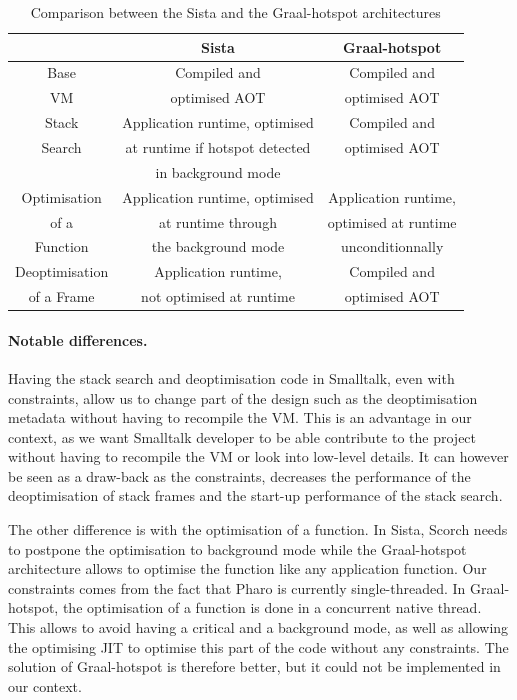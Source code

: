 \documentclass[a4paper,12pt,twoside]{../includes/ThesisStyle}
\begin{document}
\begin{table}
  \caption{Comparison between the Sista and the Graal-hotspot architectures}
  \vspace{0.1cm}
  \centering
  \begin{tabular}{c||c|c}
    \toprule
    & Sista & Graal-hotspot \\
    \midrule
    \midrule
	Base & Compiled and & Compiled and \\
	VM & optimised AOT & optimised AOT \\
    \midrule
	Stack & Application runtime, optimised & Compiled and \\
	Search & at runtime if hotspot detected & optimised AOT \\
	 & in background mode & \\
    \midrule
	Optimisation & Application runtime, optimised & Application runtime,\\
	of a & at runtime through & optimised at runtime \\
	Function & the background mode & unconditionnally \\
    \midrule
	Deoptimisation & Application runtime, & Compiled and \\
	of a Frame & not optimised at runtime & optimised AOT \\
	\bottomrule
  \end{tabular}
  \label{tbl:comparison}
\end{table}

\paragraph{Notable differences.}Having the stack search and deoptimisation code in Smalltalk, even with constraints, allow us to change part of the design such as the deoptimisation metadata without having to recompile the VM. This is an advantage in our context, as we want Smalltalk developer to be able contribute to the project without having to recompile the VM or look into low-level details. It can however be seen as a draw-back as the constraints, decreases the performance of the deoptimisation of stack frames and the start-up performance of the stack search.

The other difference is with the optimisation of a function. In Sista, Scorch needs to postpone the optimisation to background mode while the Graal-hotspot architecture allows to optimise the function like any application function. Our constraints comes from the fact that Pharo is currently single-threaded. In Graal-hotspot, the optimisation of a function is done in a concurrent native thread. This allows to avoid having a critical and a background mode, as well as allowing the optimising JIT to optimise this part of the code without any constraints. The solution of Graal-hotspot is therefore better, but it could not be implemented in our context.
\end{document}
